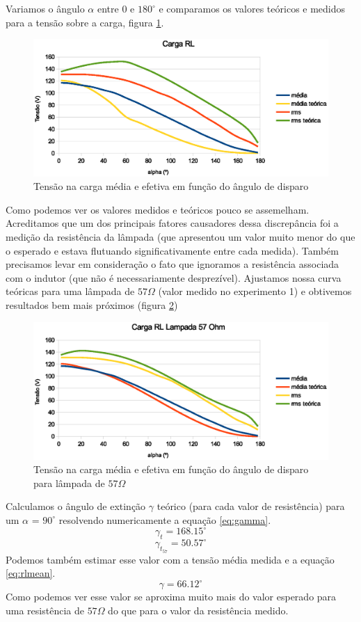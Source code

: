 \documentclass{article}
\begin{document}
Variamos o ângulo $\alpha$ entre $0$ e $180^\circ$ e comparamos os valores teóricos e medidos para a tensão sobre a carga, figura \ref{fig:rlalpha}.
\begin{figure}[H]
	\centering
	\includegraphics[width=0.7\linewidth]{dados/RL/rl_alpha}
	\caption{Tensão na carga média e efetiva em função do ângulo de disparo}
	\label{fig:rlalpha}
\end{figure}
Como podemos ver os valores medidos e teóricos pouco se assemelham. Acreditamos que um dos principais fatores causadores dessa discrepância foi a medição da resistência da lâmpada (que apresentou um valor muito menor do que o esperado e estava flutuando significativamente entre cada medida). Também precisamos levar em consideração o fato que ignoramos a resistência associada com o indutor (que não é necessariamente desprezível). Ajustamos nossa curva teóricas para uma lâmpada de $57 \Omega$ (valor medido no experimento 1) e obtivemos resultados bem mais próximos (figura \ref{fig:rlalpha57})
\begin{figure}[H]
	\centering
	\includegraphics[width=0.7\linewidth]{dados/RL/rl_alpha57Ohm}
	\caption{Tensão na carga média e efetiva em função do ângulo de disparo para lâmpada de $57 \Omega$}
	\label{fig:rlalpha57}
\end{figure}

Calculamos o ângulo de extinção $\gamma$ teórico (para cada valor de resistência) para um $\alpha$ = $90^\circ$ resolvendo numericamente a equação \ref{eq:gamma}.
\begin{equation}
	\gamma_t = 168.15^\circ
\end{equation}
\begin{equation}
\gamma_{t_{57}} = 50.57^\circ
\end{equation}
Podemos também estimar esse valor com a tensão média medida e a equação \ref{eq:rlmean}.
\begin{equation}
	\gamma = 66.12^\circ
\end{equation}
Como podemos ver esse valor se aproxima muito mais do valor esperado para uma resistência de $57 \Omega$ do que para o valor da resistência medido.
\end{document}
